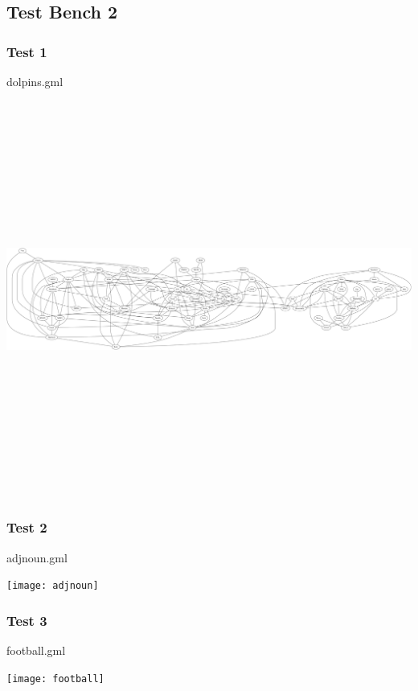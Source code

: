 \documentclass[a4paper]{report}
\begin{document}
\newpage
\begin{landscape}
\subsection{Test Bench 2}
\subsubsection{Test 1}
dolpins.gml\cite{TESTBENCH21}
\begin{center}
 \includegraphics[width=200mm, height=130mm, scale=0.1]{dolphins}
 \end{center}
\newpage
\subsubsection{Test 2}
adjnoun.gml\cite{TESTBENCH21}
\begin{center}
 \texttt{[image: adjnoun]}
 \end{center}
\newpage
\subsubsection{Test 3}
football.gml\cite{TESTBENCH21}
\begin{center}
 \texttt{[image: football]}
 \end{center}
\newpage

\end{landscape}
\end{document}
